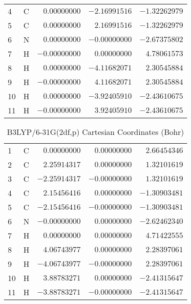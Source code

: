 \documentclass[10pt,oneside]{article}
\begin{document}
\begin{table}[h!]
\begin{multicols}{2}
\begin{tabular}{llrrr}
4  & C  & $ 0.00000000$ & $-2.16991516$ & $-1.32262979$ \\
5  & C  & $ 0.00000000$ & $ 2.16991516$ & $-1.32262979$ \\
6  & N  & $ 0.00000000$ & $-0.00000000$ & $-2.67375802$ \\
7  & H  & $-0.00000000$ & $ 0.00000000$ & $ 4.78061573$ \\
8  & H  & $ 0.00000000$ & $-4.11682071$ & $ 2.30545884$ \\
9  & H  & $-0.00000000$ & $ 4.11682071$ & $ 2.30545884$ \\
10 & H  & $ 0.00000000$ & $-3.92405910$ & $-2.43610675$ \\
11 & H  & $-0.00000000$ & $ 3.92405910$ & $-2.43610675$ \\
\bottomrule
\end{tabular}
\end{multicols}
\end{table}

\begin{table}[h]
\centering
\caption{B3LYP/6-31G(2df,p) Cartesian Coordinates (Bohr)}
\begin{tabular}{llrrr}
\toprule
1  & C  & $ 0.00000000$ & $ 0.00000000$ & $ 2.66454346$ \\
2  & C  & $ 2.25914317$ & $ 0.00000000$ & $ 1.32101619$ \\
3  & C  & $-2.25914317$ & $-0.00000000$ & $ 1.32101619$ \\
4  & C  & $ 2.15456416$ & $ 0.00000000$ & $-1.30903481$ \\
5  & C  & $-2.15456416$ & $-0.00000000$ & $-1.30903481$ \\
6  & N  & $-0.00000000$ & $ 0.00000000$ & $-2.62462340$ \\
7  & H  & $ 0.00000000$ & $ 0.00000000$ & $ 4.71422555$ \\
8  & H  & $ 4.06743977$ & $ 0.00000000$ & $ 2.28397061$ \\
9  & H  & $-4.06743977$ & $-0.00000000$ & $ 2.28397061$ \\
10 & H  & $ 3.88783271$ & $ 0.00000000$ & $-2.41315647$ \\
11 & H  & $-3.88783271$ & $-0.00000000$ & $-2.41315647$ \\
\bottomrule
\end{tabular}
\end{table}
\end{document}
